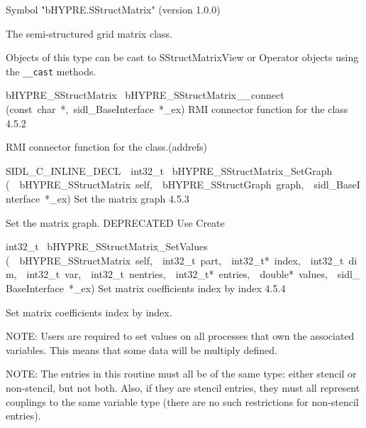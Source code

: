 \documentclass{article}
\begin{document}
\begin{cxxentry}
\begin{cxxentry}
\begin{cxxvariable}
\begin{cxxdoc}
Symbol "bHYPRE.SStructMatrix" (version 1.0.0)

The semi-structured grid matrix class.

Objects of this type can be cast to SStructMatrixView or
Operator objects using the {\tt \_\_cast} methods.
\end{cxxdoc}
\end{cxxvariable}
\begin{cxxfunction}
{bHYPRE\_SStructMatrix\ }
        {bHYPRE\_SStructMatrix\_\_connect}
        {(const\ char\ *,\ sidl\_BaseInterface\ *\_ex)}
        {
RMI connector function for the class}
        {4.5.2}
\begin{cxxdoc}

RMI connector function for the class.(addrefs)
\end{cxxdoc}
\end{cxxfunction}
\begin{cxxfunction}
{SIDL\_C\_INLINE\_DECL\ \ int32\_t\ }
        {bHYPRE\_SStructMatrix\_SetGraph}
        {(\ \ bHYPRE\_SStructMatrix\ self,\ \ bHYPRE\_SStructGraph\ graph,\ \ sidl\_BaseInterface\ *\_ex)}
        {
Set the matrix graph}
        {4.5.3}
\begin{cxxdoc}

Set the matrix graph.
DEPRECATED     Use Create
\end{cxxdoc}
\end{cxxfunction}
\begin{cxxfunction}
{int32\_t\ }
        {bHYPRE\_SStructMatrix\_SetValues}
        {(\ \ bHYPRE\_SStructMatrix\ self,\ \ int32\_t\ part,\ \ int32\_t*\ index,\ \ int32\_t\ dim,\ \ int32\_t\ var,\ \ int32\_t\ nentries,\ \ int32\_t*\ entries,\ \ double*\ values,\ \ sidl\_BaseInterface\ *\_ex)}
        {
Set matrix coefficients index by index}
        {4.5.4}
\begin{cxxdoc}

Set matrix coefficients index by index.

NOTE: Users are required to set values on all processes that
own the associated variables.  This means that some data will
be multiply defined.

NOTE: The entries in this routine must all be of the same
type: either stencil or non-stencil, but not both.  Also, if
they are stencil entries, they must all represent couplings
to the same variable type (there are no such restrictions for
non-stencil entries).


\end{cxxdoc}
\end{cxxfunction}
\end{cxxentry}
\end{cxxentry}
\end{document}
